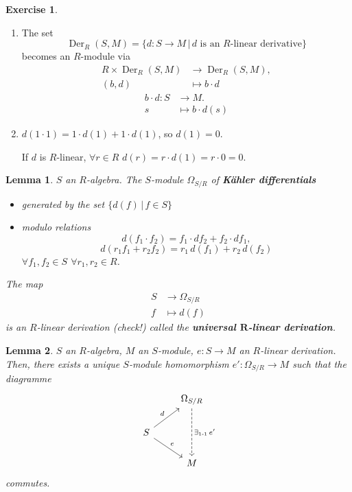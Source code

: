 \documentclass[12pt]{article}
\DeclareMathOperator{\Der}{Der}
\newtheorem*{lemma}{Lemma}
\theoremstyle{definition}
\newtheorem*{exercise}{Exercise}
\theoremstyle{remark}
\begin{document}
\begin{exercise}
\begin{enumerate}[label=\arabic*)]
\item The set
\[\Der_R(S,M)=\{d:S\rightarrow M\,|\,d\text{ is an }R\text{-linear derivative}\}\]
becomes an $R$-module via
\begin{align*}
R\times\Der_R(S,M)&\longrightarrow\Der_R(S,M),\\
(b,d)&\longmapsto b\cdot d
\end{align*}
\begin{align*}
b\cdot d:S&\longrightarrow M.\\
s&\longmapsto b\cdot d(s)
\end{align*}
\item $d(1\cdot1)=1\cdot d(1)+1\cdot d(1)$, so $d(1)=0$.

If $d$ is $R$-linear, $\forall r\in R$ $d(r)=r\cdot d(1)=r\cdot0=0$.
\end{enumerate}
\end{exercise}

\begin{lemma}
$S$ an $R$-algebra. The $S$-module $\Omega_{S/R}$ of \textbf{K\"{a}hler differentials}
\begin{itemize}[label=$-$]
\item generated by the set $\{d(f)\,|\,f\in S\}$
\item modulo relations
\[d(f_1\cdot f_2)=f_1\cdot df_2+f_2\cdot df_1,\]
\[d(r_1f_1+r_2f_2)=r_1\,d(f_1)+r_2\,d(f_2)\]
$\forall f_1,f_2\in S$ $\forall r_1,r_2\in R$.
\end{itemize}

The map
\begin{align*}
S&\longrightarrow\Omega_{S/R}\\
f&\longmapsto d(f)
\end{align*}
is an $R$-linear derivation (check!) called the \textbf{universal $\boldsymbol{R}$-linear derivation}.
\end{lemma}

\begin{lemma}
$S$ an $R$-algebra, $M$ an $S$-module, $e:S\rightarrow M$ an $R$-linear derivation. Then, there exists a unique $S$-module homomorphism $e':\Omega_{S/R}\rightarrow M$ such that the diagramme
\[
\begin{tikzcd}
&\Omega_{S/R}\arrow[dd,dashed,"\exists_{1\text{-}1}\,e'"]\\
S\arrow[ru,"d"]\arrow[rd,"e"]\\
&M
\end{tikzcd}
\]
commutes.
\end{lemma}
\end{document}
